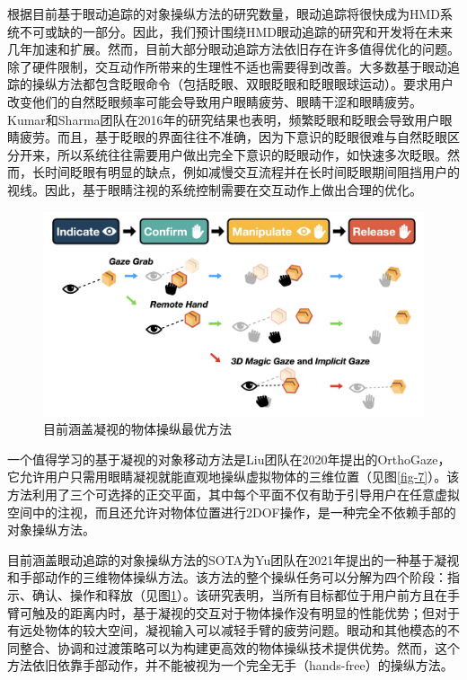 根据目前基于眼动追踪的对象操纵方法的研究数量，眼动追踪将很快成为HMD系统不可或缺的一部分。因此，我们预计围绕HMD眼动追踪的研究和开发将在未来几年加速和扩展。然而，目前大部分眼动追踪方法依旧存在许多值得优化的问题。除了硬件限制，交互动作所带来的生理性不适也需要得到改善。大多数基于眼动追踪的操纵方法都包含眨眼命令（包括眨眼、双眼眨眼和眨眼眼球运动）。要求用户改变他们的自然眨眼频率可能会导致用户眼睛疲劳、眼睛干涩和眼睛疲劳。Kumar和Sharma团队在2016年的研究结果也表明，频繁眨眼和眨眼会导致用户眼睛疲劳。而且，基于眨眼的界面往往不准确，因为下意识的眨眼很难与自然眨眼区分开来，所以系统往往需要用户做出完全下意识的眨眼动作，如快速多次眨眼。然而，长时间眨眼有明显的缺点，例如减慢交互流程并在长时间眨眼期间阻挡用户的视线。因此，基于眼睛注视的系统控制需要在交互动作上做出合理的优化。

\begin{figure}[b!]
    \centering
    \includegraphics[width=.7\textwidth]{figure/gaze_supported_sota.png}
    \caption{目前涵盖凝视的物体操纵最优方法}
    \label{fig-8}
\end{figure}

一个值得学习的基于凝视的对象移动方法是Liu团队在2020年提出的OrthoGaze，它允许用户只需用眼睛凝视就能直观地操纵虚拟物体的三维位置（见图\ref{fig-7}）。该方法利用了三个可选择的正交平面，其中每个平面不仅有助于引导用户在任意虚拟空间中的注视，而且还允许对物体位置进行2DOF操作，是一种完全不依赖手部的对象操纵方法。

目前涵盖眼动追踪的对象操纵方法的SOTA为Yu团队在2021年提出的一种基于凝视和手部动作的三维物体操纵方法。该方法的整个操纵任务可以分解为四个阶段：指示、确认、操作和释放（见图\ref{fig-8}）。该研究表明，当所有目标都位于用户前方且在手臂可触及的距离内时，基于凝视的交互对于物体操作没有明显的性能优势；但对于有远处物体的较大空间，凝视输入可以减轻手臂的疲劳问题。眼动和其他模态的不同整合、协调和过渡策略可以为构建更高效的物体操纵技术提供优势。然而，这个方法依旧依靠手部动作，并不能被视为一个完全无手（hands-free）的操纵方法。
